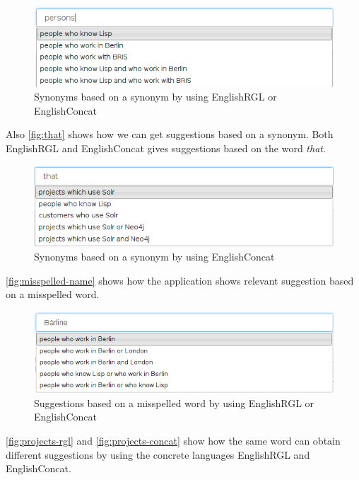 \begin{figure}[H]
\includegraphics[scale=0.6,keepaspectratio,valign=t]{./gfx/persons.png}
\caption{Synonyms based on a synonym by using EnglishRGL or EnglishConcat\label{fig:persons}}
\end{figure}

Also \autoref{fig:that} shows how we can get suggestions based on a synonym. Both EnglishRGL and EnglishConcat gives suggestions based on the word \emph{that}.

\begin{figure}[H]
\includegraphics[scale=0.6,keepaspectratio,valign=t]{./gfx/that.png}
\caption{Synonyms based on a synonym by using EnglishConcat\label{fig:that}}
\end{figure}

\autoref{fig:misspelled-name} shows how the application shows relevant suggestion based on a misspelled word.

\begin{figure}[H]
\includegraphics[scale=0.6,keepaspectratio,valign=t]{./gfx/misspelled_name.png}
\caption{Suggestions based on a misspelled word by using EnglishRGL or EnglishConcat\label{fig:misspelled-name}}
\end{figure}

\autoref{fig:projects-rgl} and \autoref{fig:projects-concat} show how the same word can obtain different suggestions by using the concrete languages EnglishRGL and EnglishConcat.

